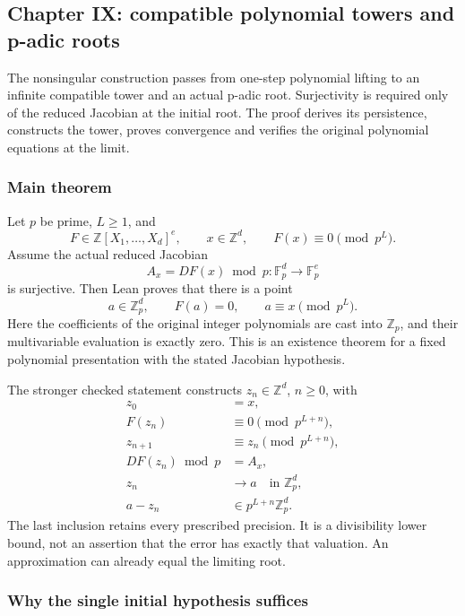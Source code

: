 \hypertarget{cont3:paper-ix-compatible-polynomial-towers-and-p-adic-roots}{%
\subsection{Chapter IX: compatible polynomial towers and p-adic
roots}\label{cont3:paper-ix-compatible-polynomial-towers-and-p-adic-roots}}

The nonsingular construction passes from one-step
polynomial lifting to an infinite compatible tower and an actual p-adic
root. Surjectivity is required only of the reduced Jacobian at the
initial root. The proof derives its persistence, constructs the tower,
proves convergence and verifies the original polynomial equations at the
limit.

\hypertarget{cont3:main-theorem}{%
\subsubsection{Main theorem}\label{cont3:main-theorem}}

Let \(p\) be prime, \(L\ge1\), and \[
F\in\mathbb Z[X_1,\ldots,X_d]^e,\qquad x\in\mathbb Z^d,
\qquad F(x)\equiv0\pmod{p^L}.
\] Assume the actual reduced Jacobian \[
A_x=DF(x)\bmod p:\mathbb F_p^d\longrightarrow\mathbb F_p^e
\] is surjective. Then Lean proves that there is a point \[
\boxed{a\in\mathbb Z_p^d,\qquad F(a)=0,\qquad
 a\equiv x\pmod{p^L}.}
\] Here the coefficients of the original integer polynomials are cast
into \(\mathbb Z_p\), and their multivariable evaluation is exactly
zero. This is an existence theorem for a fixed polynomial presentation
with the stated Jacobian hypothesis.

The stronger checked statement constructs \(z_n\in\mathbb Z^d\),
\(n\ge0\), with \[
\begin{aligned}
z_0&=x,\\
F(z_n)&\equiv0\pmod{p^{L+n}},\\
z_{n+1}&\equiv z_n\pmod{p^{L+n}},\\
DF(z_n)\bmod p&=A_x,\\
z_n&\longrightarrow a\quad\text{in }\mathbb Z_p^d,\\
a-z_n&\in p^{L+n}\mathbb Z_p^d.
\end{aligned}
\] The last inclusion retains every prescribed precision. It is a
divisibility lower bound, not an assertion that the error has exactly
that valuation. An approximation can already equal the limiting root.

\hypertarget{cont3:why-the-single-initial-hypothesis-suffices}{%
\subsubsection{Why the single initial hypothesis
suffices}\label{cont3:why-the-single-initial-hypothesis-suffices}}

